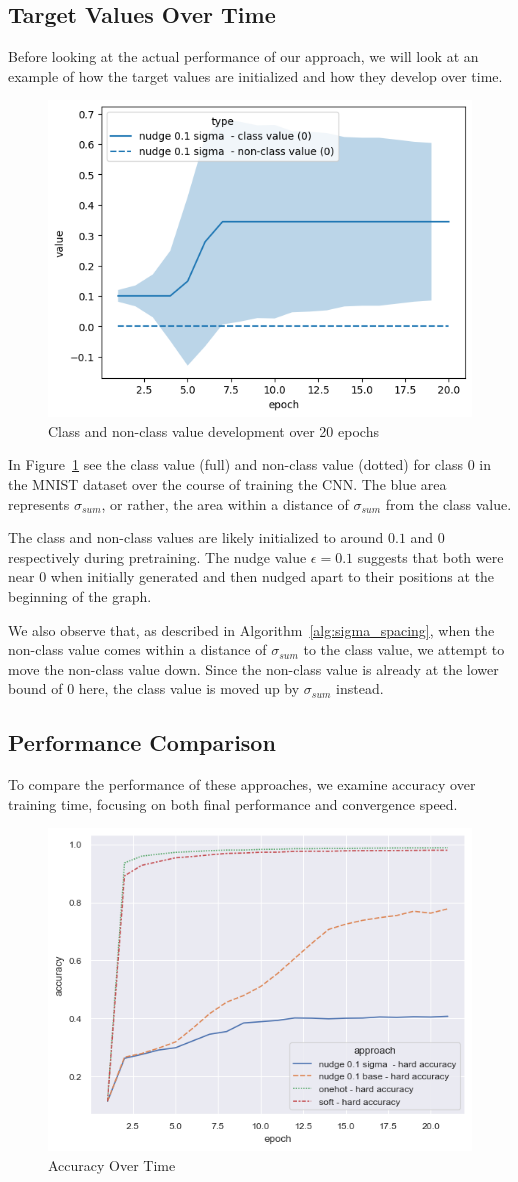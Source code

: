 \documentclass[12pt,fleqn,a4paper]{article}
\begin{document}
\subsection{Target Values Over Time}
Before looking at the actual performance of our approach, we will look at an example of how the target values are initialized and how they develop over time.
\begin{figure}[H]
    \centering
    \includegraphics[width=0.5\linewidth]{graphs/sigma.png}
    \caption{Class and non-class value development over 20 epochs}
    \label{fig:class_dev}
\end{figure}

In Figure~\ref{fig:class_dev} see the class value (full) and non-class value (dotted) for class 0 in the MNIST dataset over the course of training the CNN. The blue area represents $\sigma_{sum}$, or rather, the area within a distance of $\sigma_{sum}$ from the class value. 

The class and non-class values are likely initialized to around $0.1$ and $0$ respectively during pretraining. The nudge value $\epsilon = 0.1$ suggests that both were near $0$ when initially generated and then nudged apart to their positions at the beginning of the graph.

We also observe that, as described in Algorithm~\ref{alg:sigma_spacing}, when the non-class value comes within a distance of $\sigma_{sum}$ to the class value, we attempt to move the non-class value down. Since the non-class value is already at the lower bound of $0$ here, the class value is moved up by  $\sigma_{sum}$ instead.

\subsection{Performance Comparison}
To compare the performance of these approaches, we examine accuracy over training time, focusing on both final performance and convergence speed.
\begin{figure}
    \centering
    \includegraphics[width=0.6\linewidth]{graphs/acc.png}
    \caption{Accuracy Over Time}
    \label{fig:acc}
\end{figure}
\end{document}
